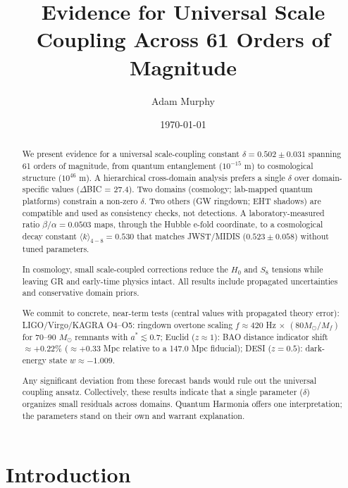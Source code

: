 \documentclass[aps,prd,preprint,onecolumn,nofootinbib,superscriptaddress,longbibliography]{revtex4-2}
\begin{document}
\title{Evidence for Universal Scale Coupling Across 61 Orders of Magnitude}

\author{Adam Murphy}

\date{\today}

\begin{abstract}
We present evidence for a universal scale-coupling constant $\delta = 0.502 \pm 0.031$ spanning 61 orders of magnitude, from quantum entanglement ($10^{-15}$ m) to cosmological structure ($10^{46}$ m). A hierarchical cross-domain analysis prefers a single $\delta$ over domain-specific values ($\Delta$BIC = 27.4). Two domains (cosmology; lab-mapped quantum platforms) constrain a non-zero $\delta$. Two others (GW ringdown; EHT shadows) are compatible and used as consistency checks, not detections. A laboratory-measured ratio $\beta/\alpha = 0.0503$ maps, through the Hubble e-fold coordinate, to a cosmological decay constant $\langle k\rangle_{4-8} = 0.530$ that matches JWST/MIDIS ($0.523 \pm 0.058$) without tuned parameters.

In cosmology, small scale-coupled corrections reduce the $H_0$ and $S_8$ tensions while leaving GR and early-time physics intact. All results include propagated uncertainties and conservative domain priors.

We commit to concrete, near-term tests (central values with propagated theory error): LIGO/Virgo/KAGRA O4--O5: ringdown overtone scaling $f \approx 420$ Hz $\times$ $(80 M_\odot/M_f)$ for 70--90 $M_\odot$ remnants with $a^* \lesssim 0.7$; Euclid ($z \approx 1$): BAO distance indicator shift $\approx +0.22\%$ ($\approx +0.33$ Mpc relative to a 147.0 Mpc fiducial); DESI ($z = 0.5$): dark-energy state $w \approx -1.009$.

Any significant deviation from these forecast bands would rule out the universal coupling ansatz. Collectively, these results indicate that a single parameter ($\delta$) organizes small residuals across domains. Quantum Harmonia offers one interpretation; the parameters stand on their own and warrant explanation.
\end{abstract}

\maketitle

\section{Introduction}
\end{document}
